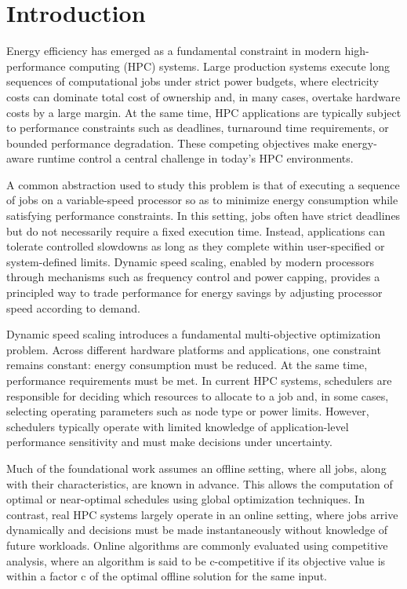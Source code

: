 \section{Introduction}\label{sec:Introduction}

Energy efficiency has emerged as a fundamental constraint in modern high-performance computing (HPC) systems. Large production systems execute long sequences of computational jobs under strict power budgets, where electricity costs can dominate total cost of ownership and, in many cases, overtake hardware costs by a large margin. At the same time, HPC applications are typically subject to performance constraints such as deadlines, turnaround time requirements, or bounded performance degradation. These competing objectives make energy-aware runtime control a central challenge in today’s HPC environments.

A common abstraction used to study this problem is that of executing a sequence of jobs on a variable-speed processor so as to minimize energy consumption while satisfying performance constraints. In this setting, jobs often have strict deadlines but do not necessarily require a fixed execution time. Instead, applications can tolerate controlled slowdowns as long as they complete within user-specified or system-defined limits. Dynamic speed scaling, enabled by modern processors through mechanisms such as frequency control and power capping, provides a principled way to trade performance for energy savings by adjusting processor speed according to demand.

Dynamic speed scaling introduces a fundamental multi-objective optimization problem. Across different hardware platforms and applications, one constraint remains constant: energy consumption must be reduced. At the same time, performance requirements must be met. In current HPC systems, schedulers are responsible for deciding which resources to allocate to a job and, in some cases, selecting operating parameters such as node type or power limits. However, schedulers typically operate with limited knowledge of application-level performance sensitivity and must make decisions under uncertainty.

Much of the foundational work assumes an offline setting, where all jobs, along with their characteristics, are known in advance. This allows the computation of optimal or near-optimal schedules using global optimization techniques. In contrast, real HPC systems largely operate in an online setting, where jobs arrive dynamically and decisions must be made instantaneously without knowledge of future workloads. Online algorithms are commonly evaluated using competitive analysis, where an algorithm is said to be c-competitive if its objective value is within a factor c of the optimal offline solution for the same input.

